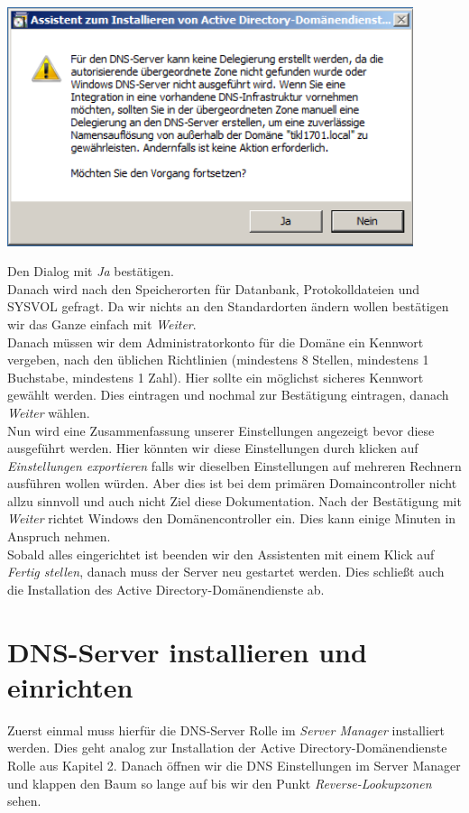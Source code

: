 \documentclass[12pt,a4paper,titlepage]{scrartcl} %
\begin{document}
	\begin{center}\includegraphics[height=7cm]{Bilder/022(dcpromo_exe09)}\\ \end{center}
	
Den Dialog mit \emph{Ja} bestätigen.\\
Danach wird nach den Speicherorten für Datanbank, Protokolldateien und SYSVOL gefragt. Da wir nichts an den Standardorten ändern wollen bestätigen wir das Ganze einfach mit \emph{Weiter}.\\
Danach müssen wir dem Administratorkonto für die Domäne ein Kennwort vergeben, nach den üblichen Richtlinien (mindestens 8 Stellen, mindestens 1 Buchstabe, mindestens 1 Zahl). Hier sollte ein möglichst sicheres Kennwort gewählt werden. Dies eintragen und nochmal zur Bestätigung eintragen, danach \emph{Weiter} wählen.\\
Nun wird eine Zusammenfassung unserer Einstellungen angezeigt bevor diese ausgeführt werden. Hier könnten wir diese Einstellungen durch klicken auf \emph{Einstellungen exportieren} falls wir dieselben Einstellungen auf mehreren Rechnern ausführen wollen würden. Aber dies ist bei dem primären Domaincontroller nicht allzu sinnvoll und auch nicht Ziel diese Dokumentation. Nach der Bestätigung mit \emph{Weiter} richtet Windows den Domänencontroller ein. Dies kann einige Minuten in Anspruch nehmen.\\
Sobald alles eingerichtet ist beenden wir den Assistenten mit einem Klick auf \emph{Fertig stellen}, danach muss der Server neu gestartet werden. Dies schließt auch die Installation des Active Directory-Domänendienste ab.

\newpage
\section{DNS-Server installieren und einrichten}
Zuerst einmal muss hierfür die DNS-Server Rolle im \emph{Server Manager} installiert werden. Dies geht analog zur Installation der Active Directory-Domänendienste Rolle aus Kapitel 2. Danach öffnen wir die DNS Einstellungen im Server Manager und klappen den Baum so lange auf bis wir den Punkt \emph{Reverse-Lookupzonen} sehen.\\
\end{document}
